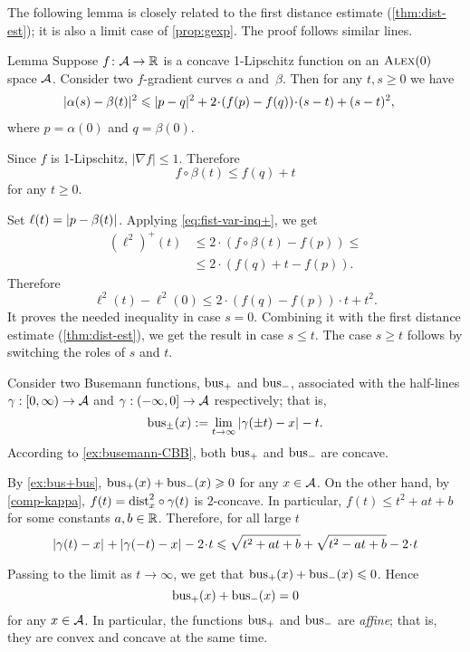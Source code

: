 The following lemma is closely related to the first distance estimate (\ref{thm:dist-est});
it is also a limit case of \ref{prop:gexp}.
The proof follows similar  lines.

\begin{thm}{Lemma}\label{lem:dist-estimate}
Suppose $f\colon\mathcal{A}\to\mathbb{R}$ is a concave 1-Lipschitz function on an $\textsc{Alex}(0)$ space $\mathcal{A}$.
Consider two $f$-gradient curves $\alpha$ and~$\beta$.
Then for any $t, s\ge 0$ we have
\begin{align*}
&\dist[2]{\alpha(s)}{\beta(t)}{}
\le 
\dist[2]{p}{q}{}+
2\cdot(f(p)-f(q))\cdot(s-t)+ (s-t)^2,
\end{align*}
where $p=\alpha(0)$ and $q=\beta(0)$.
\end{thm}

Since $f$ is 1-Lipschitz, $|\nabla f|\le1$.
Therefore 
\[f\circ\beta(t)\le f(q)+t\]
for any $t\ge0$.

Set $\ell(t)=|{p}-{\beta(t)}|_{}^{{}}$.
Applying \ref{eq:fist-var-inq+}, we get
\begin{align*}
(\ell^2)^+(t)
&\le 2\cdot \left(f\circ\beta(t)-f(p)\right)\le 
\\
&\le2\cdot\left(f(q)+t-f(p)\right).
\end{align*}
Therefore 
\[\ell^2(t)-\ell^2(0)\le 2\cdot\left(f(q)-f(p)\right)\cdot t + t^2.\]
It proves the needed inequality in case $s=0$.
Combining it with the first distance estimate (\ref{thm:dist-est}), we get the result in case $s\le t$.
The case $s\ge t$ follows by switching the roles of $s$ and $t$.
\qeds


 Consider two Busemann functions, $\operatorname{\rm bus}\nolimits_+$ and $\operatorname{\rm bus}\nolimits_-$, associated with the  half-lines $\gamma:[0,\infty)\to \mathcal{A}$ and $\gamma:(-\infty,0]\to \mathcal{A}$ respectively; that is,
\[
\operatorname{\rm bus}\nolimits_\pm(x)
\mathrel{:=}
\lim_{t\to\infty}|{\gamma(\pm t)}-{x}|_{}^{{}}- t.
\]
According to \ref{ex:busemann-CBB}, 
both $\operatorname{\rm bus}\nolimits_+$ and $\operatorname{\rm bus}\nolimits_-$ are concave.

By \ref{ex:bus+bus}, $\operatorname{\rm bus}\nolimits_+(x)+\operatorname{\rm bus}\nolimits_-(x)\geqslant0$ for any $x\in \mathcal{A}$.
On the other hand, by \ref{comp-kappa}, 
$f(t)=\mathrm{dist}_x^2\circ\gamma(t)$ 
is $2$-concave.
In particular, $f(t)\le t^2+at+b$ for some constants $a,b\in\mathbb{R}$.  Therefore, for all large $t$
\[
\dist{\gamma( t)}{x}{}+\dist{\gamma(- t)}{x}{}- 2\cdot t
\le \sqrt{ t^2+at+b}+\sqrt{ t^2-at+b}-2\cdot t
\]

Passing to the limit as $t\to\infty$, we get that  $\operatorname{\rm bus}\nolimits_+(x)+\operatorname{\rm bus}\nolimits_-(x)\leqslant 0$.
Hence
\[
\operatorname{\rm bus}\nolimits_+(x)+\operatorname{\rm bus}\nolimits_-(x)= 0
\]
for any $x\in \mathcal{A}$.
In particular, the functions $\operatorname{\rm bus}\nolimits_+$ and $\operatorname{\rm bus}\nolimits_-$ are \emph{affine};
that is, they are convex and concave at the same time.

